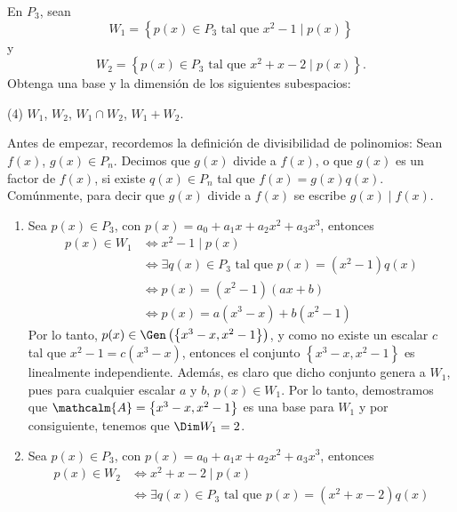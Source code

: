 \begin{examplebox}{}{}
    En $P_3$, sean
    $$W_1 = \left\{ p(x) \in P_3 \text{ tal que } x^2 - 1 \mid p(x) \right\}$$
    y
    $$W_2 = \left\{ p(x) \in P_3 \text{ tal que } x^2 + x - 2 \mid p(x) \right\}.$$
    Obtenga una base y la dimensión de los siguientes subespacios:
    \begin{tasks}(4)
        \task $W_1$,
        \task $W_2$,
        \task $W_1 \cap W_2$,
        \task $W_1 + W_2$.
    \end{tasks}

    \tcblower
    \demostracion Antes de empezar, recordemos la definición de divisibilidad de polinomios: Sean $f(x)$, $g(x) \in P_n$. Decimos que $g(x)$ divide a $f(x)$, o que $g(x)$ es un factor de $f(x)$, si existe $q(x) \in P_n$ tal que $f(x) = g(x)q(x)$. Comúnmente, para decir que $g(x)$ divide a $f(x)$ se escribe $g(x) \mid f(x)$.
    \begin{enumerate}[label=\alph*), topsep=6pt, itemsep=0pt]
        \item Sea $p(x) \in P_3$, con $p(x) = a_0 + a_1x + a_2x^2 + a_3x^3$, entonces
        \begin{align*}
            p(x) \in W_1 & \Longleftrightarrow x^2 - 1 \mid p(x) \\
            & \Longleftrightarrow \exists q(x) \in P_3 \text{ tal que } p(x) = \left( x^2 - 1 \right) q(x) \\
            & \Longleftrightarrow p(x) = \left( x^2 - 1 \right) (ax + b) \\
            & \Longleftrightarrow p(x) = a\left( x^3 - x \right) + b\left( x^2 - 1 \right)
        \end{align*}
        Por lo tanto, $p(x) \in \Gen \left(\left\{ x^3 - x, x^2 - 1 \right\}\right)$, y como no existe un escalar $c$ tal que $x^2 - 1 = c \left( x^3 - x \right)$, entonces el conjunto $\left\{ x^3 - x, x^2 - 1 \right\}$ es linealmente independiente. Además, es claro que dicho conjunto genera a $W_1$, pues para cualquier escalar $a$ y $b$, $p(x) \in W_1$. Por lo tanto, demostramos que $\mathcalm{A} = \left\{ x^3 - x, x^2 - 1 \right\}$ es una base para $W_1$ y por consiguiente, tenemos que $\Dim W_1 = 2$.
        \item Sea $p(x) \in P_3$, con $p(x) = a_0 + a_1x + a_2x^2 + a_3x^3$, entonces
        \begin{align*}
            p(x) \in W_2 & \Longleftrightarrow x^2 + x - 2 \mid p(x) \\
            & \Longleftrightarrow \exists q(x) \in P_3 \text{ tal que } p(x) = \left( x^2 + x - 2 \right) q(x) \\

\end{align*}
\end{enumerate}
\end{examplebox}
